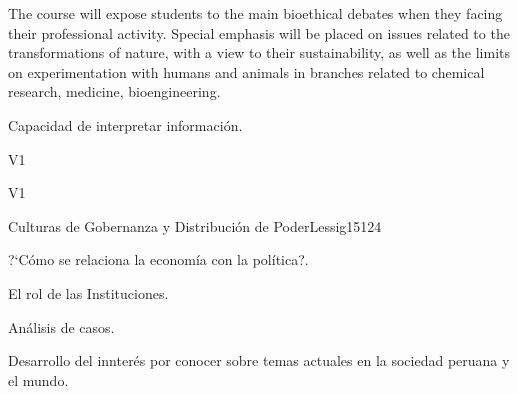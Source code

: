 \begin{syllabus}


\begin{justification}
The course will expose students to the main bioethical debates when they facing their professional activity. Special emphasis will be placed on issues related to the transformations of nature, with a view to their sustainability, as well as the limits on experimentation with humans and animals in branches related to chemical research, medicine, bioengineering.
\end{justification}

\begin{goals}
\item Capacidad de interpretar información.
\end{goals}

\begin{outcomes}{V1}
    \item {}
    \item {}
    \item {}
    
\end{outcomes}

\begin{competences}{V1}
    \item {}
    \item {}
    \item {}
    \item {}
\end{competences}

\begin{unit}{Culturas de Gobernanza y Distribución de Poder}{}{Lessig15}{12}{4}
   \begin{topics}
      \item ?`Cómo se relaciona la economía con la política?.
      \item El rol de las Instituciones.
      \item Análisis de casos.
   \end{topics}
   \begin{learningoutcomes}
      \item Desarrollo del innterés por conocer sobre temas actuales en la sociedad peruana y el mundo.
   \end{learningoutcomes}
\end{unit}

\begin{coursebibliography}
\end{coursebibliography}

\end{syllabus}
